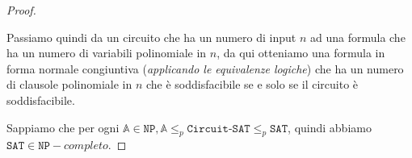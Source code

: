 \begin{proof}
\begin{enumerate}
            Passiamo quindi da un circuito che ha un numero di input $n$ ad una 
            formula che ha un numero di variabili polinomiale in $n$, da qui 
            otteniamo una formula in forma normale congiuntiva (\textit{applicando 
            le equivalenze logiche}) che ha un numero di clausole polinomiale in $n$ 
            che è soddisfacibile se e solo se il circuito è soddisfacibile.
    \end{enumerate}
    Sappiamo che per ogni $\mathbb{A} \in \texttt{NP}, \mathbb{A}
    \leq_p \texttt{Circuit-SAT} \leq_p \texttt{SAT}$, quindi abbiamo 
    $\texttt{SAT} \in \texttt{NP}-completo$.
\end{proof}